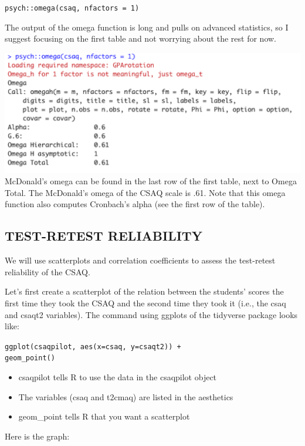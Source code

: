 \documentclass[
]{book}
\providecommand{\tightlist}{%
  \setlength{\itemsep}{0pt}\setlength{\parskip}{0pt}}
\begin{document}
\texttt{psych::omega(csaq,\ nfactors\ =\ 1)}

The output of the omega function is long and pulls on advanced statistics, so I suggest focusing on the first table and not worrying about the rest for now.

\includegraphics{img/4R.4.png}
McDonald's omega can be found in the last row of the first table, next to Omega Total. The McDonald's omega of the CSAQ scale is .61. Note that this omega function also computes Cronbach's alpha (see the first row of the table).

\hypertarget{test-retest-reliability}{%
\subsection{TEST-RETEST RELIABILITY}\label{test-retest-reliability}}

We will use scatterplots and correlation coefficients to assess the test-retest reliability of the CSAQ.

Let's first create a scatterplot of the relation between the students' scores the first time they took the CSAQ and the second time they took it (i.e., the csaq and csaqt2 variables). The command using ggplots of the tidyverse package looks like:

\texttt{ggplot(csaqpilot,\ aes(x=csaq,\ y=csaqt2))\ +}\\
\texttt{geom\_point()}

\begin{itemize}
\tightlist
\item
  csaqpilot tells R to use the data in the csaqpilot object\\
\item
  The variables (csaq and t2cmaq) are listed in the aesthetics\\
\item
  geom\_point tells R that you want a scatterplot
\end{itemize}

Here is the graph:
\end{document}
